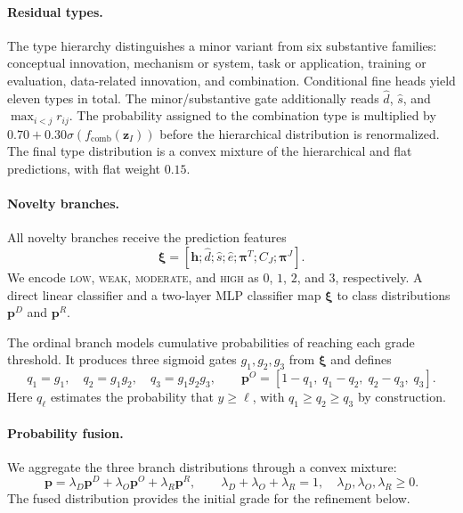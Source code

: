 \paragraph{Residual types.}
The type hierarchy distinguishes a minor variant from six substantive families:
conceptual innovation, mechanism or system, task or application, training or
evaluation, data-related innovation, and combination. Conditional fine heads
yield eleven types in total. The minor/substantive gate additionally reads
$\widehat d$, $\widehat s$, and $\max_{i<j}r_{ij}$. The probability assigned
to the combination type is multiplied by
$0.70+0.30\sigma(f_{\mathrm{comb}}(\boldsymbol{z}_I))$ before the hierarchical
distribution is renormalized. The final type distribution is a convex mixture
of the hierarchical and flat predictions, with flat weight $0.15$.

\paragraph{Novelty branches.}
All novelty branches receive the prediction features
\begin{equation}
 \boldsymbol{\xi}=[\boldsymbol{h};\widehat d;\widehat s;\widehat e;
                    \boldsymbol{\pi}^{T};C_J;\boldsymbol{\pi}^{J}].
\end{equation}
We encode \textsc{low}, \textsc{weak}, \textsc{moderate}, and \textsc{high}
as $0$, $1$, $2$, and $3$, respectively. A direct linear classifier and a
two-layer MLP classifier map $\boldsymbol{\xi}$ to class distributions
$\boldsymbol{p}^{D}$ and $\boldsymbol{p}^{R}$.

The ordinal branch models cumulative probabilities of reaching each grade
threshold. It produces three sigmoid gates $g_1,g_2,g_3$ from
$\boldsymbol{\xi}$ and defines
\begin{equation}
 q_1=g_1,\quad q_2=g_1g_2,\quad q_3=g_1g_2g_3,
 \qquad \boldsymbol{p}^{O}=[1-q_1,\;q_1-q_2,\;q_2-q_3,\;q_3].
\end{equation}
Here $q_\ell$ estimates the probability that $y\geq\ell$, with
$q_1\geq q_2\geq q_3$ by construction.

\paragraph{Probability fusion.}
We aggregate the three branch distributions through a convex mixture:
\begin{equation}
 \boldsymbol{p}=\lambda_D\boldsymbol{p}^{D}
               +\lambda_O\boldsymbol{p}^{O}
               +\lambda_R\boldsymbol{p}^{R},\qquad
 \lambda_D+\lambda_O+\lambda_R=1,
 \quad \lambda_D,\lambda_O,\lambda_R\geq0.
 \label{eq:novelty-fusion}
\end{equation}
The fused distribution provides the initial grade for the refinement below.

